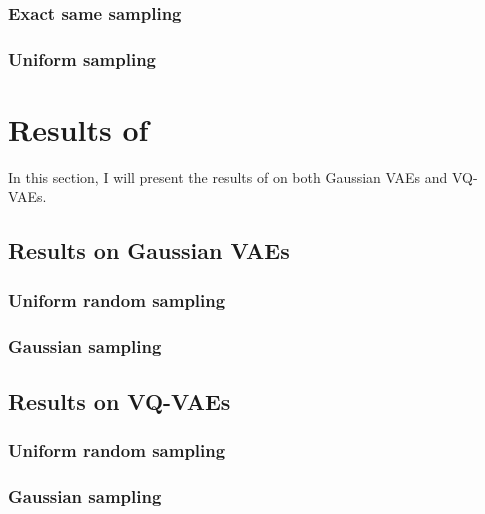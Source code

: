 \subsubsection{Exact same sampling}

\subsubsection{Uniform sampling}


\section{Results of }

In this section, I will present the results of  on both Gaussian VAEs and VQ-VAEs.

\subsection{Results on Gaussian VAEs}

\subsubsection{Uniform random sampling}

\subsubsection{Gaussian sampling}

\subsection{Results on VQ-VAEs}

\subsubsection{Uniform random sampling}

\subsubsection{Gaussian sampling}


